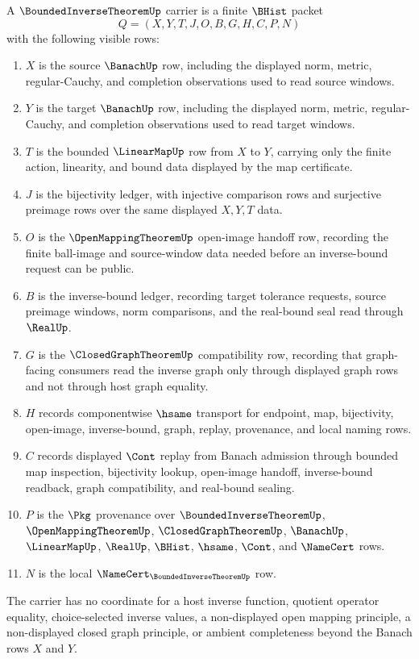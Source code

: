 \begin{definition}
\label{def:bounded-inverse-theorem-carrier}
A $\BoundedInverseTheoremUp$ carrier is a finite $\BHist$ packet
$$
Q=(X,Y,T,J,O,B,G,H,C,P,N)
$$
with the following visible rows:
\begin{enumerate}
\item $X$ is the source $\BanachUp$ row, including the displayed norm, metric, regular-Cauchy, and completion observations used to read source windows.
\item $Y$ is the target $\BanachUp$ row, including the displayed norm, metric, regular-Cauchy, and completion observations used to read target windows.
\item $T$ is the bounded $\LinearMapUp$ row from $X$ to $Y$, carrying only the finite action, linearity, and bound data displayed by the map certificate.
\item $J$ is the bijectivity ledger, with injective comparison rows and surjective preimage rows over the same displayed $X,Y,T$ data.
\item $O$ is the $\OpenMappingTheoremUp$ open-image handoff row, recording the finite ball-image and source-window data needed before an inverse-bound request can be public.
\item $B$ is the inverse-bound ledger, recording target tolerance requests, source preimage windows, norm comparisons, and the real-bound seal read through $\RealUp$.
\item $G$ is the $\ClosedGraphTheoremUp$ compatibility row, recording that graph-facing consumers read the inverse graph only through displayed graph rows and not through host graph equality.
\item $H$ records componentwise $\hsame$ transport for endpoint, map, bijectivity, open-image, inverse-bound, graph, replay, provenance, and local naming rows.
\item $C$ records displayed $\Cont$ replay from Banach admission through bounded map inspection, bijectivity lookup, open-image handoff, inverse-bound readback, graph compatibility, and real-bound sealing.
\item $P$ is the $\Pkg$ provenance over $\BoundedInverseTheoremUp$, $\OpenMappingTheoremUp$, $\ClosedGraphTheoremUp$, $\BanachUp$, $\LinearMapUp$, $\RealUp$, $\BHist$, $\hsame$, $\Cont$, and $\NameCert$ rows.
\item $N$ is the local $\NameCert_{\BoundedInverseTheoremUp}$ row.
\end{enumerate}
The carrier has no coordinate for a host inverse function, quotient operator equality, choice-selected inverse values, a non-displayed open mapping principle, a non-displayed closed graph principle, or ambient completeness beyond the Banach rows $X$ and $Y$.
\end{definition}

